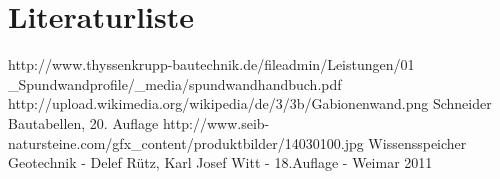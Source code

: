 \documentclass[11pt,fleqn,a4paper]{article}
\begin{document}
\section{Literaturliste}
\begin{thebibliography}{9}
http://www.thyssenkrupp-bautechnik.de/fileadmin/Leistungen/01 \_Spundwandprofile/\_media/spundwandhandbuch.pdf
 http://upload.wikimedia.org/wikipedia/de/3/3b/Gabionenwand.png
 Schneider Bautabellen, 20. Auflage
 http://www.seib-natursteine.com/gfx\_content/produktbilder/14030100.jpg
 Wissensspeicher Geotechnik - Delef Rütz, Karl Josef Witt - 18.Auflage - Weimar 2011
\end{thebibliography}
\end{document}
